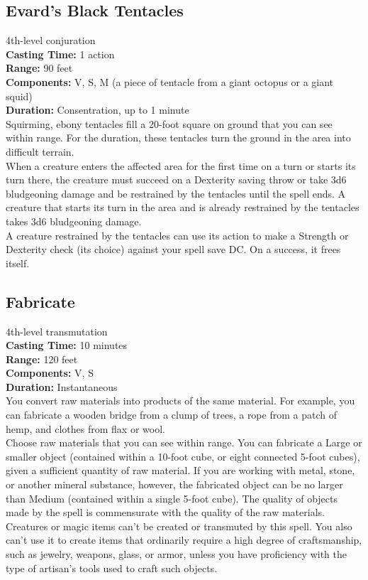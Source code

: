 \documentclass[11pt, A4paper, english]{article}
\begin{document}
		\subsection{Evard's Black Tentacles}
4th-level conjuration \\
\textbf{Casting Time:} 1 action \\
\textbf{Range:} 90 feet \\
\textbf{Components:} V, S, M (a piece of tentacle from a giant octopus or a giant squid) \\
\textbf{Duration:} Consentration, up to 1 minute \\
Squirming, ebony tentacles fill a 20-foot square on ground that you can see within range. For the duration, these tentacles turn the ground in the area into difficult terrain. \\
When a creature enters the affected area for the first time on a turn or starts its turn there, the creature must succeed on a Dexterity saving throw or take 3d6 bludgeoning damage and be restrained by the tentacles until the spell ends. A creature that starts its turn in the area and is already restrained by the tentacles takes 3d6 bludgeoning damage. \\
A creature restrained by the tentacles can use its action to make a Strength or Dexterity check (its choice) against your spell save DC. On a success, it frees itself.

		\subsection{Fabricate}
4th-level transmutation \\
\textbf{Casting Time:} 10 minutes \\
\textbf{Range:} 120 feet \\
\textbf{Components:} V, S \\
\textbf{Duration:} Instantaneous \\
You convert raw materials into products of the same material. For example, you can fabricate a wooden bridge from a clump of trees, a rope from a patch of hemp, and clothes from flax or wool. \\
Choose raw materials that you can see within range. You can fabricate a Large or smaller object (contained within a 10-foot cube, or eight connected 5-foot cubes), given a sufficient quantity of raw material. If you are working with metal, stone, or another mineral substance, however, the fabricated object can be no larger than Medium (contained within a single 5-foot cube). The quality of objects made by the spell is commensurate with the quality of the raw materials. \\
Creatures or magic items can’t be created or transmuted by this spell. You also can’t use it to create items that ordinarily require a high degree of craftsmanship, such as jewelry, weapons, glass, or armor, unless you have proficiency with the type of artisan’s tools used to craft such objects.
\end{document}

